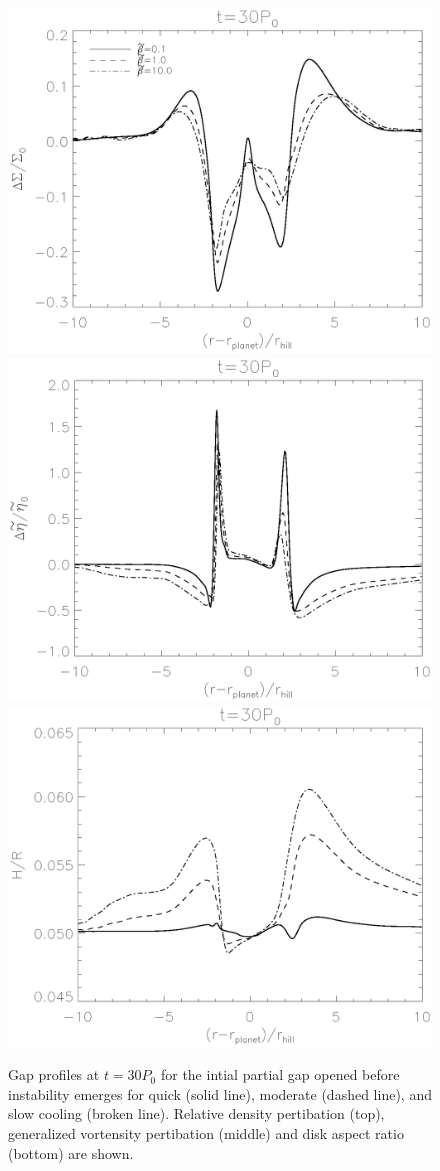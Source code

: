 \begin{figure}
  \includegraphics[width=.4\textwidth,clip=true,trim=0.5cm
    2cm 0cm 0cm]{figures/compare_sigma}
  \includegraphics[width=.4\textwidth,clip=true,trim=0.5cm
    2cm 0cm 1cm]{figures/compare_gvortensity}
\includegraphics[width=.4\textwidth,clip=true,trim=0.5cm
    0.5cm 0cm 1cm]{figures/compare_aspectratio}
  \caption{Gap profiles at $t=30P_0$ for the intial partial gap opened before instability emerges for quick (solid line), moderate (dashed line), and slow cooling (broken line). Relative density pertibation (top), generalized vortensity pertibation (middle) and disk aspect ratio (bottom) are shown. \label{intial1D}}
\end{figure}



